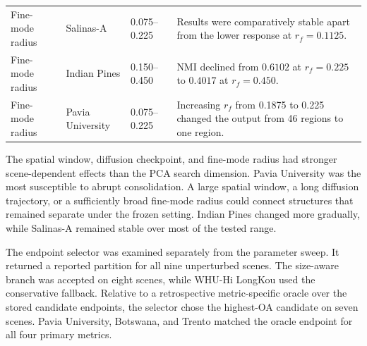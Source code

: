 \documentclass[10pt,a4paper,fleqn]{article}
\begin{document}
\begin{table}[!t]
\begin{tabularx}{\textwidth}{@{}p{}
p{}
p{}
X@{}}
Fine-mode radius
& Salinas-A
& 0.075--0.225
& Results were comparatively stable apart from the lower response at
\(r_f=0.1125\). \\

Fine-mode radius
& Indian Pines
& 0.150--0.450
& NMI declined from \(0.6102\) at \(r_f=0.225\) to \(0.4017\) at
\(r_f=0.450\). \\

Fine-mode radius
& Pavia University
& 0.075--0.225
& Increasing \(r_f\) from 0.1875 to 0.225 changed the output from
46 regions to one region. \\
\bottomrule
\end{tabularx}
\end{table}

The spatial window, diffusion checkpoint, and fine-mode radius had stronger
scene-dependent effects than the PCA search dimension. Pavia University was
the most susceptible to abrupt consolidation. A large spatial window, a long
diffusion trajectory, or a sufficiently broad fine-mode radius could connect
structures that remained separate under the frozen setting. Indian Pines
changed more gradually, while Salinas-A remained stable over most of the
tested range.

The endpoint selector was examined separately from the parameter sweep. It
returned a reported partition for all nine unperturbed scenes. The size-aware
branch was accepted on eight scenes, while WHU-Hi LongKou used the conservative
fallback. Relative to a retrospective metric-specific oracle over the stored
candidate endpoints, the selector chose the highest-OA candidate on seven
scenes. Pavia University, Botswana, and Trento matched the oracle endpoint for
all four primary metrics.
\end{document}
